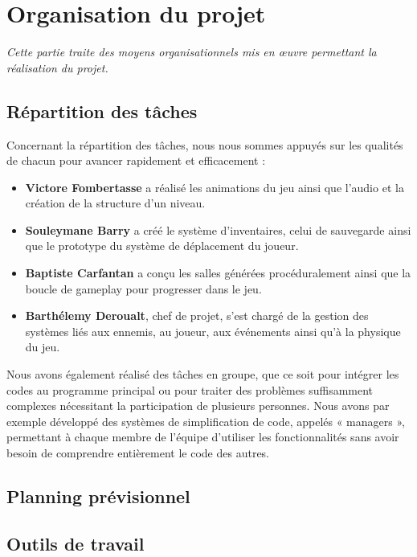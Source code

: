 \documentclass[a4paper,11pt]{article}
\begin{document}
\section{Organisation du projet}
\textit{Cette partie traite des moyens organisationnels mis en œuvre permettant la réalisation du projet.}

\subsection{Répartition des tâches}

Concernant la répartition des tâches, nous nous sommes appuyés sur les qualités de chacun pour avancer rapidement et efficacement :

\begin{itemize}[leftmargin=*]
  \item \textbf{Victore Fombertasse} a réalisé les animations du jeu ainsi que l'audio et la création de la structure d'un niveau.
  
  \item \textbf{Souleymane Barry} a créé le système d'inventaires, celui de sauvegarde ainsi que le prototype du système de déplacement du joueur.
  
  \item \textbf{Baptiste Carfantan} a conçu les salles générées procéduralement ainsi que la boucle de gameplay pour progresser dans le jeu.
  
  \item \textbf{Barthélemy Deroualt}, chef de projet, s'est chargé de la gestion des systèmes liés aux ennemis, au joueur, aux événements ainsi qu'à la physique du jeu.
\end{itemize}

Nous avons également réalisé des tâches en groupe, que ce soit pour intégrer les codes au programme principal ou pour traiter des problèmes suffisamment complexes nécessitant la participation de plusieurs personnes. Nous avons par exemple développé des systèmes de simplification de code, appelés « managers », permettant à chaque membre de l'équipe d'utiliser les fonctionnalités sans avoir besoin de comprendre entièrement le code des autres.

\subsection{Planning prévisionnel}

\subsection{Outils de travail}
\end{document}
